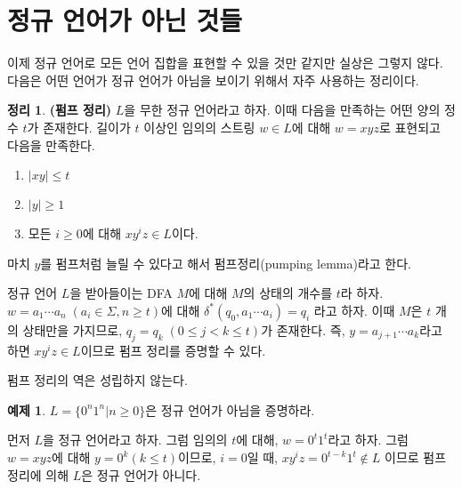 \documentclass[b5paper, 10pt]{book}
\theoremstyle{definition}
\newtheorem{thm}[defn]{정리}
\newtheorem{ex}[defn]{예제}
\newenvironment{pf*}{\pushQED{\qed}\pf}{\popQED\endpf}
\begin{document}
\section{정규 언어가 아닌 것들}
이제 정규 언어로 모든 언어 집합을 표현할 수 있을 것만 같지만 실상은 그렇지 않다.
다음은 어떤 언어가 정규 언어가 아님을 보이기 위해서 자주 사용하는 정리이다.
\begin{thm}
    \textbf{(펌프 정리)}
    $L$을 무한 정규 언어라고 하자. 이때 다음을 만족하는 어떤 양의 정수 $t$가 존재한다.
길이가 $t$ 이상인 임의의 스트링 $w \in L$에 대해 $w = xyz$로 표현되고 다음을 만족한다.
\begin{enumerate}
    \item $\vert xy \vert \le t$
    \item $\vert y \vert \ge 1$
    \item 모든 $i \ge 0$에 대해 $xy^{i}z \in L$이다.
\end{enumerate}
\end{thm}
마치 $y$를 펌프처럼 늘릴 수 있다고 해서 펌프정리(pumping lemma)라고 한다. 
\begin{pf*}
    정규 언어 $L$을 받아들이는 DFA $M$에 대해 $M$의 상태의 개수를 $t$라 하자.
$w = a_1 \cdots a_n \; (a_i \in \Sigma, n \ge t)$에 대해 $\delta^*(q_0, a_1 \cdots a_i) = q_i$
라고 하자. 이때 $M$은 $t$ 개의 상태만을 가지므로, $q_j = q_k \; (0 \le j < k \le t) $가
존재한다. 즉, $y = a_{j+1} \cdots a_k$라고 하면 $xy^iz \in L$이므로 펌프 정리를 증명할 수 있다.  
\begin{figure}[ht]
    \centering
    \caption{} 
    \label{pump}
\end{figure}
\end{pf*}
펌프 정리의 역은 성립하지 않는다. 
\begin{ex} \label{0n1n}
$L = \{0^n 1^n \vert n \ge 0\}$은 정규 언어가 아님을 증명하라.
\end{ex}
먼저 $L$을 정규 언어라고 하자. 그럼 임의의 $t$에 대해, $w = 0^t 1^t$라고 하자. 그럼
$w=xyz$에 대해 $y = 0^k (k \le t)$이므로, $i=0$일 때, $xy^iz= 0^{t-k} 1^t \notin L$
이므로 펌프 정리에 의해 $L$은 정규 언어가 아니다. 
\end{document}
